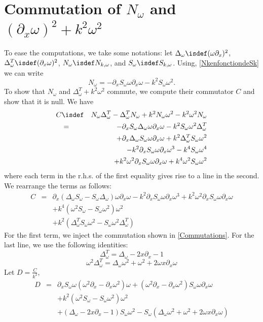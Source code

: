 \documentclass[a4paper]{article}
\begin{document}
	\section{Commutation of $N_\omega$ and $(\partial_x \omega)^2 + k^2\omega^2$}
	\label{ann:commut}
	To ease the computations, we take some notations: let $\Delta_\omega \isdef (\omega \partial_x)^2$, $\Delta_\omega^T \isdef (\partial_x \omega)^2$,  $N_\omega \isdef N_{k,\omega}$, and $S_\omega \isdef S_{k,\omega}$. Using, \autoref{NkenfonctiondeSk} we can write 
	\[N_\omega = -\partial_x S_\omega \omega \partial_x \omega - k^2 S_\omega \omega^2.\]
	To show that $N_\omega$ and $\Delta_\omega^T + k^2\omega^2$ commute, we compute their commutator $C$ and show that it is null. 
	We have 
	\begin{eqnarray*}
		C &\isdef& N_\omega \Delta_\omega^T - \Delta_\omega^T N_\omega + k^2N_\omega \omega^2 - k^2 \omega^2 N_\omega \\
		&=& -\partial_x S_\omega \Delta_\omega \omega \partial_x \omega  - k^2 S_\omega \omega^2 \Delta_\omega^T \\
		&& + \partial_x \Delta_\omega S_\omega \omega \partial_x \omega + k^2 \Delta_\omega^T S_\omega \omega^2 \\
		&& - k^2 \partial_x S_\omega \omega \partial_x \omega^3 - k^4 S_\omega \omega^4 \\
		&& + k^2 \omega^2 \partial_x S_\omega \omega \partial_x \omega + k^4 \omega^2 S_\omega \omega^2
	\end{eqnarray*}
	where each term in the r.h.s. of the first equality gives rise to a line in the second. We rearrange the terms as follows:
	\begin{eqnarray*}
		C &=& \partial_x (\Delta_\omega S_\omega - S_\omega \Delta_\omega) \omega \partial_x \omega - k^2 \partial_x S_\omega \omega \partial_x \omega^3 + k^2 \omega^2 \partial_x S_\omega \omega\partial_x \omega\\	
		&& + k^4 (\omega^2 S_\omega - S_\omega \omega^2) \omega^2\\
		&& + k^2(\Delta_\omega^T S_\omega \omega^2 - S_\omega \omega^2 \Delta_\omega^T)
	\end{eqnarray*}
	For the first term, we inject the commutation shown in \autoref{Commutations}. For the last line, we use the following identities: 
	\[ \Delta_\omega^T = \Delta_\omega - 2x \partial_x - 1\]
	\[ \omega^2 \Delta_\omega^T = \Delta_\omega \omega^2 + \omega^2 + 2 \omega x \partial_x \omega\]
	Let $D = \frac{C}{k^2}$, 
	\begin{eqnarray*}
		D &=& \partial_x S_\omega \omega (\omega^2\partial_x - \partial_x \omega^2) \omega  + (\omega^2 \partial_x - \partial_x \omega^2)S_\omega \omega \partial_x \omega\\
		&&+ k^2(\omega^2 S_\omega - S_\omega \omega^2) \omega^2\\
		&&+ (\Delta_\omega - 2x \partial_x - 1)S_\omega \omega^2 - S_\omega(\Delta_\omega \omega^2 + \omega^2 + 2\omega x \partial_x \omega) 
	\end{eqnarray*}
\end{document}
